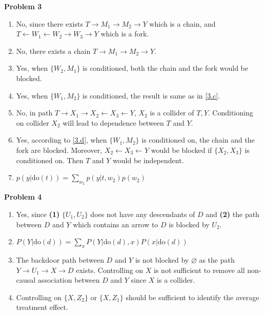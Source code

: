 \documentclass{notes}
\begin{document}
	\noindent\textbf{Problem 3}
	\begin{enumerate}[label=\textbf{(\alph*)}]
		\item No, since there exists $T \rightarrow M_1 \rightarrow M_2\rightarrow Y$ which is a chain, and $T\leftarrow W_1\leftarrow W_2\rightarrow W_3\rightarrow Y$ which is a fork.
		\item No, there exists a chain $T\rightarrow M_1\rightarrow M_2\rightarrow Y$.
		\item Yes, when $\{W_2, M_1\}$ is conditioned, both the chain and the fork would be blocked.\label{3.c}
		\item Yes, when $\{W_1, M_2\}$ is conditioned, the result is same as in \ref{3.c}.\label{3.d}
		\item No, in path $T\rightarrow X_1\rightarrow X_2\leftarrow X_3\leftarrow Y$, $X_2$ is a collider of $T, Y$. Conditioning on collider $X_2$ will lead to dependence between $T$ and $Y$.
		\item Yes, according to \ref{3.d}, when $\{W_1, M_2\}$ is conditioned on, the chain and the fork are blocked. Moreover, $X_2\leftarrow X_3\leftarrow Y$ would be blocked if $\{X_2, X_3\}$ is conditioned on. Then $T$ and $Y$ would be independent.
		\item $p(y|\mathrm{do}(t)) = \sum_{w_2}p(y|t, w_2)p(w_2)$
	\end{enumerate}

	\noindent\textbf{Problem 4}
	\begin{enumerate}[label=\textbf{(\alph*)}]
		\item Yes, since \textbf{(1)} $\{U_1, U_2\}$ does not have any descendants of $D$ and \textbf{(2)} the path between $D$ and $Y$ which contains an arrow to $D$ is blocked by $U_2$.
		\item $P(Y|\mathrm{do}(d)) = \sum_{x} P(Y|\mathrm{do}(d), x)P(x|\mathrm{do}(d))$
		\item The backdoor path between $D$ and $Y$ is not blocked by $\varnothing$ as the path $Y\rightarrow U_1\rightarrow X\rightarrow D$ exists. Controlling on $X$ is not sufficient to remove all non-causal association between $D$ and $Y$ since $X$ is a collider.
		\item Controlling on $\{X, Z_2\}$ or $\{X, Z_1\}$ should be sufficient to identify the average treatment effect.
	\end{enumerate}
\end{document}
